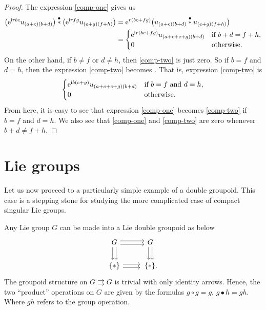 \documentclass[pdftex]{sigma}
\numberwithin{equation}{section}
\theoremstyle{definition}
\newcommand{\stardot}{\overset{{\bullet}}{*}}
\newcommand{\starcirc}{\overset{\circ}{*}}
\newcommand{\darrow}{\arrow[d, shift right] \arrow[d, shift left]}
\newcommand{\rarrow}{\arrow[r, shift right] \arrow[r, shift left]}
\newcommand{\grpd}{\rightrightarrows}
\begin{document}
\begin{proof}
  The expression \eqref{comp-one} gives us
  \begin{align*}
     \big({\rm e}^{{\rm i} rbc}u_{(a+c)(b+d)}\big)\stardot\big({\rm e}^{{\rm i} rfg}u_{(e+g)(f+h)}\big)&
    = {\rm e}^{ r(bc+fg)}\big(u_{(a+c)(b+d)}\stardot u_{(e+g)(f+h)}\big)\\
    & = \begin{cases} {\rm e}^{{\rm i} r(bc+fg)} u_{(a+c+e+g)(b+d)} & \text{if } b+d=f+h,\\
    0 &\text{otherwise}.
    \end{cases}
  \end{align*}
  On the other hand, if $b\neq f$ or $d\neq h$, then \eqref{comp-two} is just zero. So if $b=f$ and $d=h$, then the expression \eqref{comp-two} becomes
\smash{$
     u_{(a+e)b} \starcirc u_{(c+g)d}
    = {\rm e}^{{\rm i} b(c+g)} u_{(a+e+c+g)(b+d)}$}.
  That is, expression \eqref{comp-two} is
  \[
  \begin{cases} {\rm e}^{{\rm i} b(c+g)} u_{(a+e+c+g)(b+d)} & \text{if } b=f\text{ and }d=h,\\
  0 & \text{otherwise}.
  \end{cases}
  \]
   From here, it is easy to see that expression \eqref{comp-one} becomes \eqref{comp-two} if $b=f$ and $d=h$. We also see that \eqref{comp-one} and \eqref{comp-two} are zero whenever $b+d\neq f+h$.
\end{proof}

\section{Lie groups}\label{Section:compact.Lie.groups}
Let us now proceed to a particularly simple example of a double groupoid. This case is a stepping stone for studying the more complicated case of compact singular Lie groups.

Any Lie group $ G $ can be made into a Lie double groupoid as below
\[
\begin{tikzcd}
 G \darrow \rarrow & G \darrow \\
\{* \} \rarrow &\, \{ * \}.
\end{tikzcd}
\]
The groupoid structure on $ G \grpd G $ is trivial with only identity arrows. Hence, the two ``product'' operations on $ G $ are given by the formulas
$g \circ g = g$, $g \bullet h = gh$.
Where $ gh$ refers to the group operation.
\end{document}
